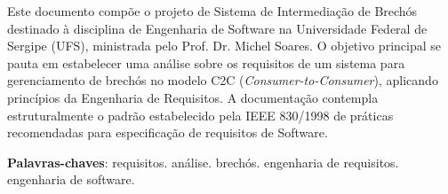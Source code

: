 \documentclass[
	article,			%
	11pt,				%
	oneside,			%
	a4paper,			%
	english,			%
	brazil,				%
	sumario=tradicional
	]{abntex2}
\begin{document}
\frenchspacing 

\newcommand{\inst}{UNIVERSIDADE FEDERAL DE SERGIPE (UFS)}
\newcommand{\centro}{CENTRO DE CIÊNCIAS EXATAS E TECNOLOGIA (CCET)}
\newcommand{\dept}{DEPARTAMENTO DE COMPUTAÇÃO (DCOMP)}
\newcommand{\disc}{ENGENHARIA DE SOFTWARE - COMP0503}

\makeatletter
\def\@maketitle{
\newpage
\null
\vskip 2em
\begin{center}
    \normalsize
    {\inst \par \centro \par \dept \par \disc \par}
    \vskip 3em
\let \footnote \thanks
{\normalsize \@title \par}
\vskip 3em
{\normalsize \flushright
    \lineskip .5em
    \begin{tabular}[t]{c}
    \@author
    \end{tabular}\par}
\vskip 1em
\end{center}%
\par
\vskip 1.5em}
\makeatother

\maketitle

\thispagestyle{empty}

\begin{resumoumacoluna}
Este documento compõe o projeto de Sistema de Intermediação de Brechós destinado à disciplina de Engenharia de Software na Universidade Federal de Sergipe (UFS), ministrada pelo Prof. Dr. Michel Soares. O objetivo principal se pauta em estabelecer uma análise sobre os requisitos de um sistema para gerenciamento de brechós no modelo C2C (\textit{Consumer-to-Consumer}), aplicando princípios da Engenharia de Requisitos. A documentação contempla estruturalmente o padrão estabelecido pela IEEE 830/1998 de práticas recomendadas para especificação de requisitos de Software.
 
 \vspace{\onelineskip}
 
 \noindent
 \textbf{Palavras-chaves}: requisitos. análise. brechós. engenharia de requisitos. engenharia de software.
\end{resumoumacoluna}
\end{document}
